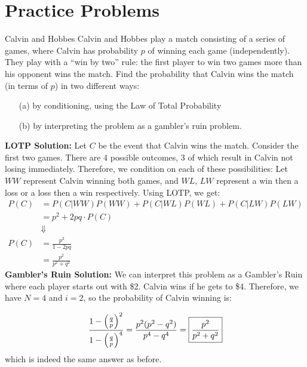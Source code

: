 \documentclass[11pt]{article}
\begin{document}
\newpage
\section*{Practice Problems}
\begin{exercise}{Calvin and Hobbes} 
Calvin and Hobbes play a match consisting of a series of games, where Calvin has probability $p$ of winning each game (independently). They play with a ``win by two'' rule: the first player to win two games more than his opponent wins the match. Find the probability that Calvin wins the match (in terms of $p$) in two different ways: 
\begin{enumerate}
\item [(a)] by conditioning, using the Law of Total Probability 
\item [(b)] by interpreting the problem as a gambler's ruin problem. 
\end{enumerate}
\end{exercise}
\begin{solution}{5}
\textbf{LOTP Solution: } Let $C$ be the event that Calvin wins the match. Consider the first two games. There are 4 possible outcomes, 3 of which result in Calvin not losing immediately. Therefore, we condition on each of these possibilities: Let $WW$ represent Calvin winning both games, and $WL$, $LW$ represent a win then a loss or a loss then a win respectively. Using LOTP, we get: 
\begin{align*}
P(C) &= P(C | WW) P(WW) + P(C | WL) P (WL) + P(C | LW) P(LW) \\ 
&= p^2 + 2pq \cdot P(C) \\ 
&\Downarrow \\
P(C) &= \frac{p^2}{1 - 2pq} \\ 
&=  \boxed{\frac{p^2}{p^2 + q^2}}
\end{align*}  
\textbf{Gambler's Ruin Solution: } We can interpret this problem as a Gambler's Ruin where each player starts out with \$2. Calvin wins if he gets to \$4. Therefore, we have $N = 4$ and $i = 2$, so the probability of Calvin winning is: 

$$ \frac{1 - \left( \frac{q}{p} \right)^2}{1 - \left( \frac{q}{p} \right)^4} = \frac{p^2(p^2 - q^2)}{p^4 - q^4} =\boxed{ \frac{p^2}{p^2 + q^2}}$$
which is indeed the same answer as before. 
\end{solution}
\newpage
\end{document}
